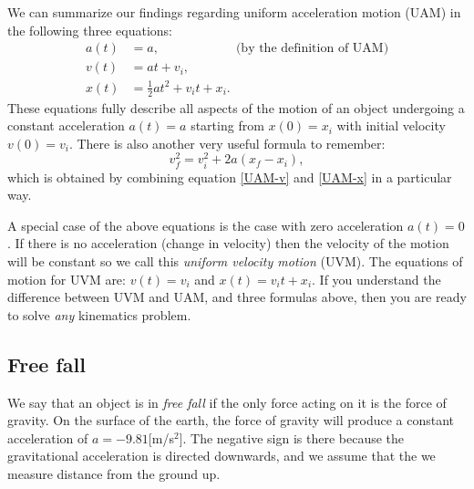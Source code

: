 \documentclass[letterpaper,9pt,journal]{IEEEtran}
\newcommand{\be}{\begin{equation}}
\newcommand{\ee}{\end{equation}}
\begin{document}





We can summarize our findings regarding uniform acceleration motion (UAM)
in the following three equations: 
\begin{align}
  a(t) &= a, \qquad \qquad \qquad \text{(by the definition of UAM)} \nonumber \\
  v(t) &= at + v_i, \label{UAM-v}\\
  x(t) &= \tfrac{1}{2}at^2 +  v_i t + x_i. \label{UAM-x}
\end{align}
These equations fully describe all aspects of the motion of an object undergoing a 
constant acceleration $a(t)=a$ starting from $x(0)=x_i$ with initial velocity $v(0)=v_i$.
%
There is also another very useful formula to remember:
\be
 v_f^2 = v_i^2 + 2a(x_f-x_i), %
\ee
which is obtained by combining equation \eqref{UAM-v} and \eqref{UAM-x} in a particular way.

A special case of the above equations is the case with zero acceleration $a(t)=0$.
If there is no acceleration (change in velocity) then the velocity of the motion will be
constant so we call this \emph{uniform velocity motion} (UVM). 
The equations of motion for UVM are: $v(t)=v_i$ and $x(t)=v_it + x_i$.
If you understand the difference between UVM and UAM, and three formulas above,
then you are ready to solve \emph{any} kinematics problem. %

\vspace{-3mm}
\subsection{Free fall}

We say that an object is in \emph{free fall} if the only force acting on it is the force of gravity.
On the surface of the earth, the force of gravity will produce a constant acceleration
of $a=-9.81$[m/s$^2$]. The negative sign is there because the gravitational acceleration
is directed downwards, and we assume that the we measure distance from the ground up.
\end{document}

